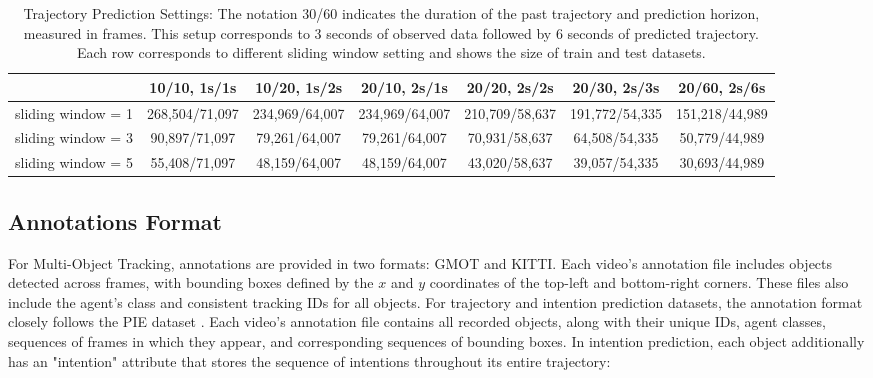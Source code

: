 \begin{table*}[t]
\centering
\caption{Trajectory Prediction Settings: The notation 30/60 indicates the duration of the past trajectory and prediction horizon, measured in frames. This setup corresponds to 3 seconds of observed data followed by 6 seconds of predicted trajectory. Each row corresponds to different sliding window setting and shows the size of train and test datasets.}
\begin{tabular}{|p{3cm}|c|c|c|c|c|c|}
\hline
 & \textbf{10/10, 1s/1s} & \textbf{10/20, 1s/2s} & \textbf{20/10, 2s/1s} & \textbf{20/20, 2s/2s} & \textbf{20/30, 2s/3s}  & \textbf{20/60, 2s/6s} \\ \hline
sliding window = 1 & 268,504/71,097 & 234,969/64,007 & 234,969/64,007 & 210,709/58,637 & 191,772/54,335 & 151,218/44,989 \\ \hline
sliding window = 3 & 90,897/71,097 & 79,261/64,007 & 79,261/64,007 & 70,931/58,637 & 64,508/54,335 & 50,779/44,989  \\ \hline
sliding window = 5 & 55,408/71,097 & 48,159/64,007  & 48,159/64,007 & 43,020/58,637 & 39,057/54,335& 30,693/44,989  \\ \hline
\end{tabular}
\label{tab:prediction_datasets}
\end{table*}

\subsection{Annotations Format}

For Multi-Object Tracking, annotations are provided in two formats: GMOT and KITTI. Each video’s annotation file includes objects detected across frames, with bounding boxes defined by the $x$ and $y$ coordinates of the top-left and bottom-right corners. These files also include the agent's class and consistent tracking IDs for all objects. For trajectory and intention prediction datasets, the annotation format closely follows the PIE dataset \cite{9008118}. Each video’s annotation file contains all recorded objects, along with their unique IDs, agent classes, sequences of frames in which they appear, and corresponding sequences of bounding boxes. In intention prediction, each object additionally has an "intention" attribute that stores the sequence of intentions throughout its entire trajectory:

